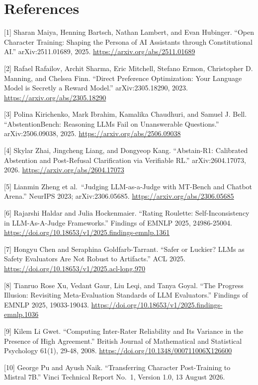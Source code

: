 \documentclass[9pt,letterpaper,twocolumn]{extarticle}
\begin{document}
\section*{References}

{[}1{]} Sharan Maiya, Henning Bartsch, Nathan Lambert, and Evan
Hubinger. ``Open Character Training: Shaping the Persona of AI
Assistants through Constitutional AI.'' arXiv:2511.01689, 2025.
\url{https://arxiv.org/abs/2511.01689}

{[}2{]} Rafael Rafailov, Archit Sharma, Eric Mitchell, Stefano Ermon,
Christopher D. Manning, and Chelsea Finn. ``Direct Preference
Optimization: Your Language Model is Secretly a Reward Model.''
arXiv:2305.18290, 2023. \url{https://arxiv.org/abs/2305.18290}

{[}3{]} Polina Kirichenko, Mark Ibrahim, Kamalika Chaudhuri, and Samuel
J. Bell. ``AbstentionBench: Reasoning LLMs Fail on Unanswerable
Questions.'' arXiv:2506.09038, 2025.
\url{https://arxiv.org/abs/2506.09038}

{[}4{]} Skylar Zhai, Jingcheng Liang, and Dongyeop Kang. ``Abstain-R1:
Calibrated Abstention and Post-Refusal Clarification via Verifiable
RL.'' arXiv:2604.17073, 2026. \url{https://arxiv.org/abs/2604.17073}

{[}5{]} Lianmin Zheng et al.~``Judging LLM-as-a-Judge with MT-Bench and
Chatbot Arena.'' NeurIPS 2023; arXiv:2306.05685.
\url{https://arxiv.org/abs/2306.05685}

{[}6{]} Rajarshi Haldar and Julia Hockenmaier. ``Rating Roulette:
Self-Inconsistency in LLM-As-A-Judge Frameworks.'' Findings of EMNLP
2025, 24986-25004.
\url{https://doi.org/10.18653/v1/2025.findings-emnlp.1361}

{[}7{]} Hongyu Chen and Seraphina Goldfarb-Tarrant. ``Safer or Luckier?
LLMs as Safety Evaluators Are Not Robust to Artifacts.'' ACL 2025.
\url{https://doi.org/10.18653/v1/2025.acl-long.970}

{[}8{]} Tianruo Rose Xu, Vedant Gaur, Liu Leqi, and Tanya Goyal. ``The
Progress Illusion: Revisiting Meta-Evaluation Standards of LLM
Evaluators.'' Findings of EMNLP 2025, 19033-19043.
\url{https://doi.org/10.18653/v1/2025.findings-emnlp.1036}

{[}9{]} Kilem Li Gwet. ``Computing Inter-Rater Reliability and Its
Variance in the Presence of High Agreement.'' British Journal of
Mathematical and Statistical Psychology 61(1), 29-48, 2008.
\url{https://doi.org/10.1348/000711006X126600}

{[}10{]} George Pu and Ayush Naik. ``Transferring Character
Post-Training to Mistral 7B.'' Vinci Technical Report No.~1, Version
1.0, 13 August 2026.
\end{document}
